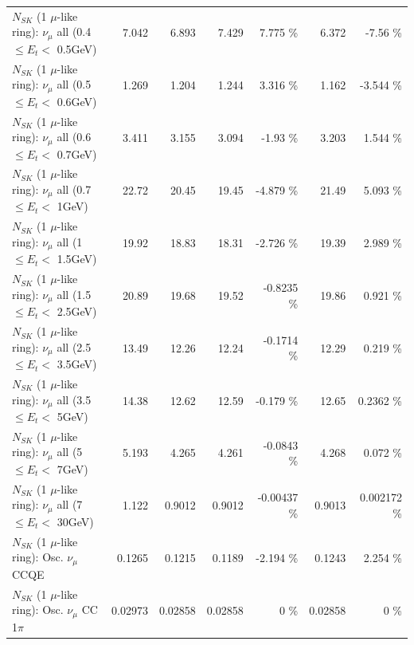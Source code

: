 \begin{table}
\begin{tabular}{| l | r | r | r  r | r  r |}
       $N_{SK}$ (1 $\mu$-like ring): $\nu_{\mu}$ all (0.4 $\leq E_{t} <$ 0.5GeV) &           7.042 &           6.893 &           7.429 &    7.775 \%  &           6.372 &    -7.56 \%  \\ 
       $N_{SK}$ (1 $\mu$-like ring): $\nu_{\mu}$ all (0.5 $\leq E_{t} <$ 0.6GeV) &           1.269 &           1.204 &           1.244 &    3.316 \%  &           1.162 &   -3.544 \%  \\ 
       $N_{SK}$ (1 $\mu$-like ring): $\nu_{\mu}$ all (0.6 $\leq E_{t} <$ 0.7GeV) &           3.411 &           3.155 &           3.094 &    -1.93 \%  &           3.203 &    1.544 \%  \\ 
         $N_{SK}$ (1 $\mu$-like ring): $\nu_{\mu}$ all (0.7 $\leq E_{t} <$ 1GeV) &           22.72 &           20.45 &           19.45 &   -4.879 \%  &           21.49 &    5.093 \%  \\ 
         $N_{SK}$ (1 $\mu$-like ring): $\nu_{\mu}$ all (1 $\leq E_{t} <$ 1.5GeV) &           19.92 &           18.83 &           18.31 &   -2.726 \%  &           19.39 &    2.989 \%  \\ 
       $N_{SK}$ (1 $\mu$-like ring): $\nu_{\mu}$ all (1.5 $\leq E_{t} <$ 2.5GeV) &           20.89 &           19.68 &           19.52 &  -0.8235 \%  &           19.86 &    0.921 \%  \\ 
       $N_{SK}$ (1 $\mu$-like ring): $\nu_{\mu}$ all (2.5 $\leq E_{t} <$ 3.5GeV) &           13.49 &           12.26 &           12.24 &  -0.1714 \%  &           12.29 &    0.219 \%  \\ 
         $N_{SK}$ (1 $\mu$-like ring): $\nu_{\mu}$ all (3.5 $\leq E_{t} <$ 5GeV) &           14.38 &           12.62 &           12.59 &   -0.179 \%  &           12.65 &   0.2362 \%  \\ 
           $N_{SK}$ (1 $\mu$-like ring): $\nu_{\mu}$ all (5 $\leq E_{t} <$ 7GeV) &           5.193 &           4.265 &           4.261 &  -0.0843 \%  &           4.268 &    0.072 \%  \\ 
          $N_{SK}$ (1 $\mu$-like ring): $\nu_{\mu}$ all (7 $\leq E_{t} <$ 30GeV) &           1.122 &          0.9012 &          0.9012 & -0.00437 \%  &          0.9013 & 0.002172 \%  \\ 
\hline
\hline
                               $N_{SK}$ (1 $\mu$-like ring): Osc. $\nu_\mu$ CCQE &          0.1265 &          0.1215 &          0.1189 &   -2.194 \%  &          0.1243 &    2.254 \%  \\ 
                          $N_{SK}$ (1 $\mu$-like ring): Osc. $\nu_\mu$ CC 1$\pi$ &         0.02973 &         0.02858 &         0.02858 &        0 \%  &         0.02858 &        0 \%  \\ 

\end{tabular}
\end{table}
